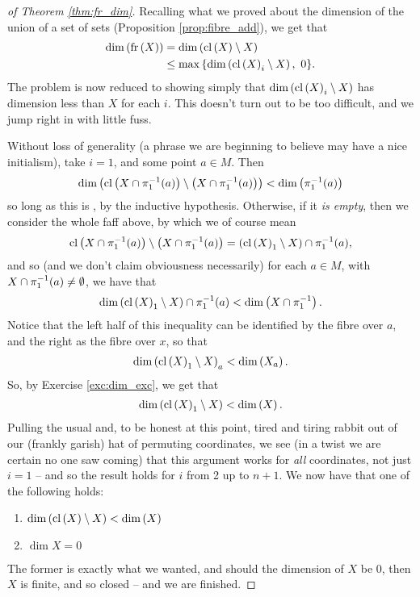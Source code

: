 \begin{proof}[of Theorem \ref{thm:fr_dim}]
    Recalling what we proved about the dimension of the union of a set of sets (Proposition \ref{prop:fibre_add}), we get that
      \begin{align*}
        \operatorname{dim}\left(\operatorname{fr}\left(X\right)\right) &= \operatorname{dim}\left(\operatorname{cl}\left(X\right) \setminus X\right)\\
                     &\leq \max{ \left\{ \operatorname{dim}\left(\operatorname{cl}\left(X\right)_i \setminus X\right), \ 0 \right\} }.
      \end{align*}
      The problem is now reduced to showing simply that $\operatorname{dim}\left(\operatorname{cl}\left(X\right)_i \setminus X\right)$ has dimension less than $X$ for each $i$. This doesn't turn out to be too difficult, and we jump right in with little fuss.

      Without loss of generality (a phrase we are beginning to believe may have a nice initialism), take $i = 1$, and some point $a \in M$. Then
        \begin{align*}
          \operatorname{dim}\left( \operatorname{cl}\left(X \cap \pi_1^{-1}(a)\right) \setminus \left( X \cap \pi_1^{-1}(a) \right) \right) < \operatorname{dim}\left(\pi_1^{-1}(a)\right)
        \end{align*}
      so long as this is \inhb, by the inductive hypothesis. Otherwise, if it \emph{is empty}, then we consider the whole faff above, by which we of course mean
        \begin{align*}
          \operatorname{cl}\left(X \cap \pi_1^{-1}(a)\right) \setminus \left( X \cap \pi_1^{-1}(a) \right) = \left( \operatorname{cl}\left(X\right)_1 \setminus X \right) \cap \pi_1^{-1}(a),
        \end{align*}
      and so (and we don't claim obviousness necessarily) for each $a \in M$, with $X \cap \pi_1^{-1}(a) \neq \emptyset$, we have that
        \begin{align*}
          \operatorname{dim}\left(\operatorname{cl}\left(X\right)_1 \setminus X\right) \cap \pi_1^{-1}(a) < \operatorname{dim}\left(X \cap \pi_1^{-1}\right).
        \end{align*}
      Notice that the left half of this inequality can be identified by the fibre over $a$, and the right as the fibre over $x$, so that
        \begin{align*}
          \operatorname{dim}\left(\operatorname{cl}\left(X\right)_1 \setminus X\right)_a < \operatorname{dim}\left(X_a\right).
        \end{align*}
      So, by Exercise \ref{exc:dim_exc}, we get that
        \begin{align*}
          \operatorname{dim}\left(\operatorname{cl}\left(X\right)_1 \setminus X\right) < \operatorname{dim}\left(X\right).
        \end{align*}
      Pulling the usual and, to be honest at this point, tired and tiring rabbit out of our (frankly garish) hat of permuting coordinates, we see (in a twist we are certain no one saw coming) that this argument works for \emph{all} coordinates, not just $i = 1$ -- and so the result holds for $i$ from 2 up to $n + 1$. We now have that one of the following holds:
        \begin{enumerate}
         \item $\operatorname{dim}\left(\operatorname{cl}\left(X\right) \setminus X\right) < \operatorname{dim}\left(X\right)$
         \item $\dim{X} = 0$
       \end{enumerate}
      The former is exactly what we wanted, and should the dimension of $X$ be 0, then $X$ is finite, and so closed -- and we are finished.
      \smartqed
\end{proof}
